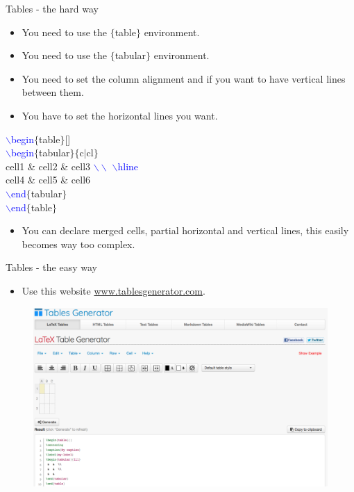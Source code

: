\documentclass[usenames,dvipsnames,aspectratio=169]{beamer}
\newcommand{\aitem}{\item[$\cdot$]}
\begin{document}
\begin{frame}[t]{Tables - the hard way}
\begin{itemize}
\aitem You need to use the \textcolor{PineGreen}{$\{$table$\}$} environment.
\aitem You need to use the \textcolor{PineGreen}{$\{$tabular$\}$} environment.
\aitem You need to set the column alignment and if you want to have vertical lines between them.
\aitem You have to set the horizontal lines you want.
\end{itemize}
\textcolor{blue}{$\backslash$begin}\textcolor{PineGreen}{$\{$table$\}$}[]\\
\textcolor{blue}{$\backslash$begin}\textcolor{PineGreen}{$\{$tabular$\}$}\textcolor{PineGreen}{$\{$c$|$cl$\}$}\\
cell1 \& cell2 \& cell3 \textcolor{blue}{$\backslash\backslash$} \textcolor{blue}{$\backslash$hline}\\
cell4 \& cell5 \& cell6\\
\textcolor{blue}{$\backslash$end}\textcolor{PineGreen}{$\{$tabular$\}$}\\
\textcolor{blue}{$\backslash$end}\textcolor{PineGreen}{$\{$table$\}$}
\begin{itemize}
\aitem You can declare merged cells, partial horizontal and vertical lines, this easily becomes way too complex.
\end{itemize}
\end{frame}


\begin{frame}[t]{Tables - the easy way}
\begin{itemize}
\aitem Use this website \textcolor{blue}{\url{www.tablesgenerator.com}}.
\end{itemize}
\begin{figure}
\includegraphics[width=.7\linewidth]{tablegenerator.png}
\end{figure}
\end{frame}
\end{document}
